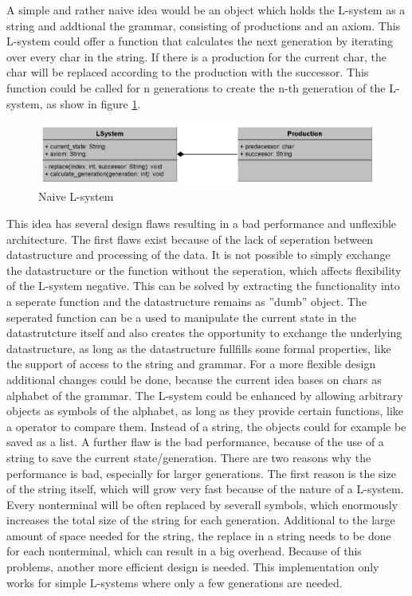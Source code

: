 \documentclass[english]{cpp-hmwk}
\begin{document}
\medskip

\noindent A simple and rather naive idea would be an object which holds the L-system as a string and addtional the grammar, consisting of productions and an axiom. This L-system could offer a function that calculates the next generation by iterating over every char in the string. If there is a production for the current char, the char will be replaced according to the production with the successor. This function could be called for n generations to create the n-th generation of the L-system, as show in figure \ref{figure:naive_lsystem}.

\begin{figure}[h!]
	\centering
	\includegraphics[width=1\columnwidth]{../graphs/LSystem/naive/class_diagram_l_system_naive.png}
	\caption{Naive L-system}
	\label{figure:naive_lsystem}
\end{figure}

\medskip
\noindent This idea has several design flaws resulting in a bad performance and unflexible architecture. The first flaws exist because of the lack of seperation between datastructure and processing of the data. It is not possible to simply exchange the datastructure or the function without the seperation, which affects flexibility of the L-system negative. This can be solved by extracting the functionality into a seperate function and the datastructure remains as ''dumb'' object. The seperated function can be a used to manipulate the current state in the datastrutcture itself and also creates the opportunity to exchange the underlying datastructure, as long as the datastructure fullfills some formal properties, like the support of access to the string and grammar.\newline
For a more flexible design additional changes could be done, because the current idea bases on chars as alphabet of the grammar. The L-system could be enhanced by allowing arbitrary objects as symbols of the alphabet, as long as they provide certain functions, like a operator to compare them. Instead of a string, the objects could for example be saved as a list.\newline
A further flaw is the bad performance, because of the use of a string to save the current state/generation. There are two reasons why the performance is bad, especially for larger generations. The first reason is the size of the string itself, which will grow very fast because of the nature of a L-system. Every nonterminal will be often replaced by severall symbols, which enormously increases the total size of the string for each generation. Additional to the large amount of space needed for the string, the replace in a string needs to be done for each nonterminal, which can result in a big overhead. Because of this problems, another more efficient design is needed.\newline
This implementation only works for simple L-systems where only a few generations are needed.
\end{document}
